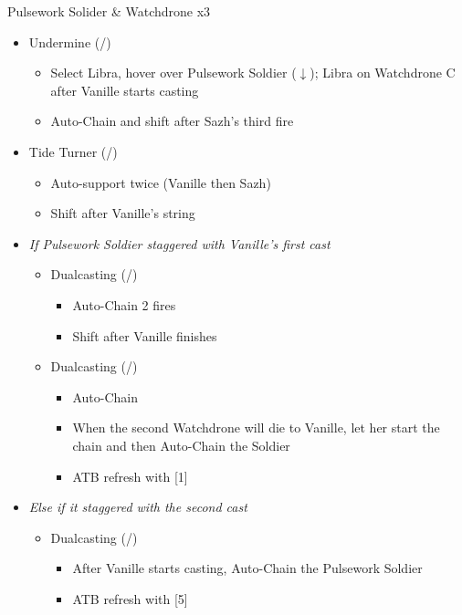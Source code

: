 \renewcommand{\first}{[1] Dualcasting (\rav/\rav)}
\renewcommand{\second}{[2] Tide Turner (\syn/\sab)}
\renewcommand{\third}{[3] Yin \& Yang (\rav/\med)}
\renewcommand{\fourth}{[4] Undermine (\rav/\sab)}
\renewcommand{\fifth}{[5] Dualcasting (\rav/\rav)}
\begin{battle}[0:40]{Pulsework Solider \& Watchdrone x3}
	\begin{itemize}
		\item \fourth
		      \begin{itemize}
			      \item Select Libra, hover over Pulsework Soldier ($\downarrow$); Libra on Watchdrone C after Vanille starts casting
			      \item Auto-Chain and shift after Sazh's third fire
		      \end{itemize}
		\item \second
		      \begin{itemize}
			      \item Auto-support twice (Vanille then Sazh)
			      \item Shift after Vanille's string
		      \end{itemize}
		\item \textit{If Pulsework Soldier staggered with Vanille's first cast}
		      \begin{itemize}
			      \item \first
			            \begin{itemize}
				            \item Auto-Chain 2 fires
				            \item Shift after Vanille finishes
			            \end{itemize}
			      \item \fifth
			            \begin{itemize}
				            \item Auto-Chain
				            \item When the second Watchdrone will die to Vanille, let her start the chain and then Auto-Chain the Soldier
				            \item ATB refresh with [1]
			            \end{itemize}
		      \end{itemize}
		\item \textit{Else if it staggered with the second cast}
		      \begin{itemize}
			      \item \first
			            \begin{itemize}
				            \item After Vanille starts casting, Auto-Chain the Pulsework Soldier
				            \item ATB refresh with [5]
			            \end{itemize}
		      \end{itemize}
	\end{itemize}
	\itemdrop{6}{Aegisol}
\end{battle}
\vfill
\renewcommand{\first}{[1] Tri-disaster (\rav/\rav/\rav)}
\renewcommand{\fourth}{[4] Variety (\rav/\sab/\med)}

